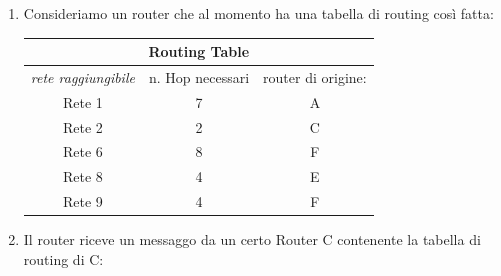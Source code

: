 \begin{enumerate}
    \item Consideriamo un router che al momento ha una tabella di routing così fatta:

\begin{table}[ht]
\centering
\begin{tabular}{ccc}
\multicolumn{3}{c}{Routing Table}                                                                                                   \\ \hline
\multicolumn{1}{|c|}{\textit{rete raggiungibile}} & \multicolumn{1}{c|}{n. Hop necessari} & \multicolumn{1}{c|}{router di origine:} \\ \hline
\multicolumn{1}{|c|}{Rete 1}                      & \multicolumn{1}{c|}{7}                & \multicolumn{1}{c|}{A}                  \\ \hline
\multicolumn{1}{|c|}{Rete 2}                      & \multicolumn{1}{c|}{2}                & \multicolumn{1}{c|}{C}                  \\ \hline
\multicolumn{1}{|c|}{Rete 6}                      & \multicolumn{1}{c|}{8}                & \multicolumn{1}{c|}{F}                  \\ \hline
\multicolumn{1}{|c|}{Rete 8}                      & \multicolumn{1}{c|}{4}                & \multicolumn{1}{c|}{E}                  \\ \hline
\multicolumn{1}{|c|}{Rete 9}                      & \multicolumn{1}{c|}{4}                & \multicolumn{1}{c|}{F}                  \\ \hline
\end{tabular}
\end{table}


    
    \item Il router riceve un messaggo da un certo Router C contenente la tabella di routing di C:


\end{enumerate}
